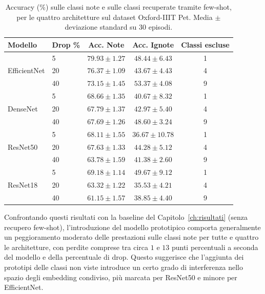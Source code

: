 \begin{table}[!htb]
    \centering
    \small
    \caption{Accuracy (\%) sulle classi note e sulle classi recuperate tramite few-shot, per le quattro architetture sul dataset Oxford-IIIT Pet. Media $\pm$ deviazione standard su 30 episodi.}
    \label{tab:proto-pet}
    \begin{tabular}{llccc}
        \toprule
        \textbf{Modello} & \textbf{Drop \%} & \textbf{Acc. Note} & \textbf{Acc. Ignote} & \textbf{Classi escluse} \\
        \midrule
        \multirow{3}{*}{EfficientNet} & 5  & $79.93 \pm 1.27$ & $48.44 \pm 6.43$  & 1 \\
                                       & 20 & $76.37 \pm 1.09$ & $43.67 \pm 4.43$  & 4 \\
                                       & 40 & $73.15 \pm 1.45$ & $53.37 \pm 4.08$  & 9 \\
        \midrule
        \multirow{3}{*}{DenseNet}     & 5  & $68.66 \pm 1.35$ & $40.67 \pm 8.32$  & 1 \\ 
                                       & 20 & $67.79 \pm 1.37$ & $42.97 \pm 5.40$  & 4 \\
                                       & 40 & $67.69 \pm 1.26$ & $48.60 \pm 3.24$  & 9 \\
        \midrule
        \multirow{3}{*}{ResNet50}     & 5  & $68.11 \pm 1.55$ & $36.67 \pm 10.78$ & 1 \\
                                       & 20 & $67.63 \pm 1.33$ & $44.28 \pm 5.12$  & 4 \\
                                       & 40 & $63.78 \pm 1.59$ & $41.38 \pm 2.60$  & 9 \\
        \midrule
        \multirow{3}{*}{ResNet18}     & 5  & $69.18 \pm 1.14$ & $49.67 \pm 9.12$  & 1 \\
                                       & 20 & $63.32 \pm 1.22$ & $35.53 \pm 4.21$  & 4 \\
                                       & 40 & $61.15 \pm 1.57$ & $38.85 \pm 4.40$  & 9 \\
        \bottomrule
    \end{tabular}
\end{table}

Confrontando questi risultati con la baseline del Capitolo~\ref{ch:risultati} (senza recupero few-shot), l'introduzione del modello prototipico comporta generalmente un peggioramento moderato delle prestazioni sulle classi note per tutte e quattro le architetture, con perdite comprese tra circa $1$ e $13$ punti percentuali a seconda del modello e della percentuale di drop. Questo suggerisce che l'aggiunta dei prototipi delle classi non viste introduce un certo grado di interferenza nello spazio degli embedding condiviso, più marcata per ResNet50 e minore per EfficientNet.

